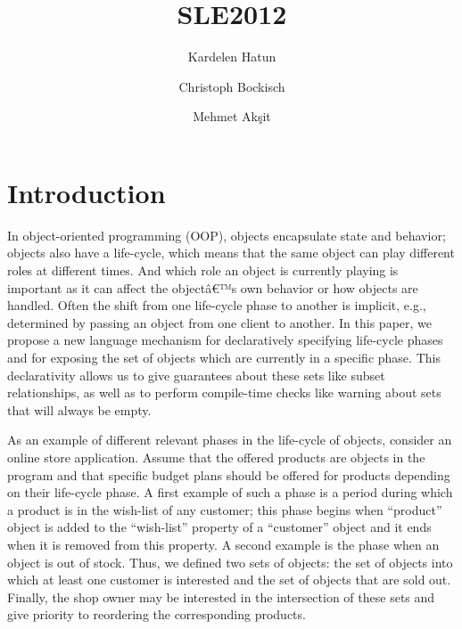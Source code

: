 \documentclass{llncs}
\begin{document}

\title{SLE2012}

\author{Kardelen Hatun \and Christoph Bockisch \and Mehmet Ak\c{s}it}

\maketitle

\section{Introduction}
In object-oriented programming (OOP), objects encapsulate state and behavior; objects also have a life-cycle, which means that the same object can play different roles at different times. And which role an object is currently playing is important as it can affect the objectâ€™s own behavior or how objects are handled. Often the shift from one life-cycle phase to another is implicit, e.g., determined by passing an object from one client to another. In this paper, we propose a new language mechanism for declaratively specifying life-cycle phases and for exposing the set of objects which are currently in a specific phase. This declarativity allows us to give guarantees about these sets like subset relationships, as well as to perform compile-time checks like warning about sets that will always be empty.

As an example of different relevant phases in the life-cycle of objects, consider an online store application. Assume that the offered products are objects in the program and that specific budget plans should be offered for products depending on their life-cycle phase. A first example of such a phase is a period during which a product is in the wish-list of any customer; this phase begins when ``product'' object is added to the ``wish-list'' property of a ``customer'' object and it ends when it is removed from this property. A second example is the phase when an object is out of stock. Thus, we defined two sets of objects: the set of objects into which at least one customer is interested and the set of objects that are sold out. Finally, the shop owner may be interested in the intersection of these sets and give priority to reordering the corresponding products.
\end{document}
